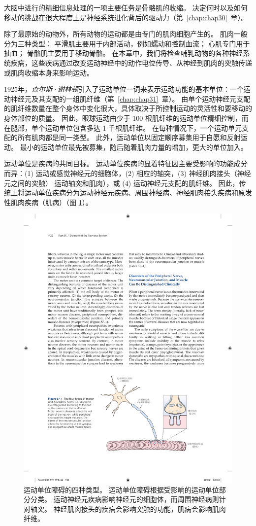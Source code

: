 大脑中进行的精细信息处理的一项主要任务是骨骼肌的收缩。
决定何时以及如何移动的挑战在很大程度上是神经系统进化背后的驱动力（第~\ref{chap:chap30}~章）。


除了最原始的动物外，所有动物的运动都是由专门的肌肉细胞产生的。
肌肉一般分为三种类型：
平滑肌主要用于内部活动，例如蠕动和控制血流；
心肌专门用于抽血；
骨骼肌主要用于移动骨骼。
在本章中，我们将检查哺乳动物的各种神经系统疾病，这些疾病通过改变运动神经中的动作电位传导、从神经到肌肉的突触传递或肌肉收缩本身来影响运动。


1925年，\textit{查尔斯·谢林顿}引入了运动单位一词来表示运动功能的基本单位：一个运动神经元及其支配的一组肌纤维（第~\ref{chap:chap31}~章）。
由单个运动神经元支配的肌纤维数量在整个身体中变化很大，具体取决于所控制运动的灵活性和要移动的身体部位的质量。
因此，眼球运动由少于 100 根肌纤维的运动单位精细控制，而在腿部，单个运动单位包含多达 1 千根肌纤维。
在每种情况下，一个运动单元支配的所有肌肉都是同一类型。
此外，运动单位以固定顺序募集用于自愿和反射运动。
最小的运动单位最先被募集，随后随着肌肉力量的增加，更大的单位加入。


运动单位是疾病的共同目标。
运动单位疾病的显着特征因主要受影响的功能成分而异：(1) 运动或感觉神经元的细胞体，(2) 相应的轴突，(3) 神经肌肉接头（神经元之间的突触） 运动轴突和肌肉），或 (4) 运动神经元支配的肌纤维。
因此，传统上将运动单位疾病分为运动神经元疾病、周围神经病、神经肌肉接头疾病和原发性肌肉疾病（肌病）（图 \ref{fig:57_1}）。


\begin{figure}[htbp]
	\centering
	\includegraphics[width=0.8\linewidth]{chap57/fig_57_1}
	\caption{运动单位障碍的四种类型。
		运动单位障碍根据受影响的运动单位部分分类。
		运动神经元疾病影响神经元的细胞体，而周围神经病则针对轴突。
		神经肌肉接头的疾病会影响突触的功能，肌病会影响肌肉纤维。}
	\label{fig:57_1}
\end{figure}



